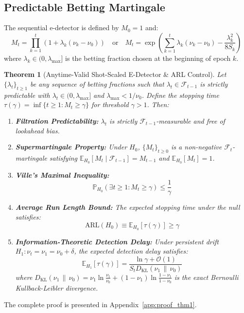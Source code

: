 \documentclass[aps,pra,twocolumn,superscriptaddress,10pt,floatfix]{revtex4-2}
\newtheorem{theorem}{Theorem}
\begin{document}
\subsection{Predictable Betting Martingale}
The sequential e-detector is defined by $M_0 = 1$ and:
\begin{equation}
M_t = \prod_{k=1}^t \left( 1 + \lambda_k (\nu_k - \nu_0) \right) \quad \text{or} \quad M_t = \exp\left( \sum_{k=1}^t \lambda_k (\nu_k - \nu_0) - \frac{\lambda_k^2}{8 S_k} \right)
\label{eq:martingale_def}
\end{equation}
where $\lambda_k \in (0, \lambda_{\max}]$ is the betting fraction chosen at the beginning of epoch $k$.

\begin{theorem}[Anytime-Valid Shot-Scaled E-Detector \& ARL Control]
\label{thm:edetector}
Let $\{\lambda_t\}_{t \ge 1}$ be any sequence of betting fractions such that $\lambda_t \in \mathcal{F}_{t-1}$ is strictly predictable with $\lambda_t \in (0, \lambda_{\max}]$ and $\lambda_{\max} < 1/\nu_0$. Define the stopping time $\tau(\gamma) = \inf\{t \ge 1 : M_t \ge \gamma\}$ for threshold $\gamma > 1$. Then:
\begin{enumerate}
    \item \textbf{Filtration Predictability:} $\lambda_t$ is strictly $\mathcal{F}_{t-1}$-measurable and free of lookahead bias.
    \item \textbf{Supermartingale Property:} Under $H_0$, $\{M_t\}_{t \ge 0}$ is a non-negative $\mathcal{F}_t$-martingale satisfying $\mathbb{E}_{H_0}[M_t \mid \mathcal{F}_{t-1}] = M_{t-1}$ and $\mathbb{E}_{H_0}[M_t] = 1$.
    \item \textbf{Ville's Maximal Inequality:}
    \begin{equation}
    \mathbb{P}_{H_0}\left( \exists t \ge 1 : M_t \ge \gamma \right) \le \frac{1}{\gamma}
    \end{equation}
    \item \textbf{Average Run Length Bound:} The expected stopping time under the null satisfies:
    \begin{equation}
    \mathrm{ARL}(H_0) \equiv \mathbb{E}_{H_0}[\tau(\gamma)] \ge \gamma
    \end{equation}
    \item \textbf{Information-Theoretic Detection Delay:} Under persistent drift $H_1: \nu_t = \nu_1 = \nu_0 + \delta$, the expected detection delay satisfies:
    \begin{equation}
    \mathbb{E}_{H_1}[\tau(\gamma)] = \frac{\ln \gamma + \mathcal{O}(1)}{S_t D_{\mathrm{KL}}(\nu_1 \,\|\, \nu_0)}
    \end{equation}
    where $D_{\mathrm{KL}}(\nu_1 \,\|\, \nu_0) = \nu_1 \ln\frac{\nu_1}{\nu_0} + (1 - \nu_1) \ln\frac{1 - \nu_1}{1 - \nu_0}$ is the exact Bernoulli Kullback-Leibler divergence.
\end{enumerate}
\end{theorem}
The complete proof is presented in Appendix~\ref{app:proof_thm1}.
\end{document}

